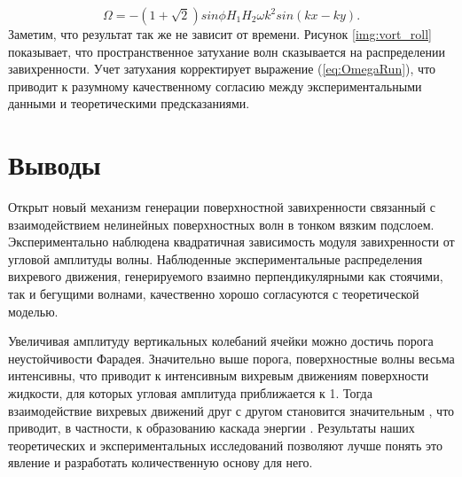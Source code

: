 \begin{equation}
 \label{eq:OmegaRun}
\Omega = -(1 + \sqrt{2})sin \phi H_1 H_2 \omega k^2 sin(kx-ky).
\end{equation}
Заметим, что результат так же не зависит от времени. Рисунок \ref{img:vort_roll} показывает, что пространственное затухание волн сказывается на распределении завихренности. Учет затухания корректирует выражение (\ref{eq:OmegaRun}), что приводит к разумному качественному согласию между экспериментальными данными и теоретическими предсказаниями.%

\section{Выводы}
Открыт новый механизм генерации поверхностной завихренности связанный с взаимодействием нелинейных поверхностных волн в тонком вязким подслоем. 
Экспериментально наблюдена квадратичная зависимость модуля завихренности от угловой амплитуды волны.
Наблюденные экспериментальные распределения вихревого движения, генерируемого взаимно перпендикулярными как стоячими, так и бегущими волнами, качественно хорошо согласуются с теоретической моделью.

Увеличивая амплитуду вертикальных колебаний ячейки можно достичь порога неустойчивости Фарадея. Значительно выше порога, поверхностные волны весьма интенсивны, что приводит к интенсивным вихревым движениям поверхности жидкости, для которых угловая амплитуда приближается к 1. Тогда взаимодействие вихревых движений друг с другом становится значительным \cite{Punzmann}, что приводит, в частности, к образованию каскада энергии \cite{Francois2013}. Результаты наших теоретических и экспериментальных исследований позволяют лучше понять это явление и разработать количественную основу для него.

\clearpage